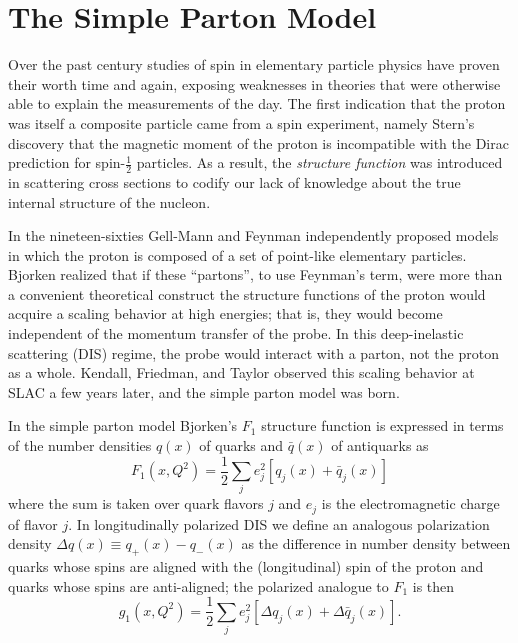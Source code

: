 \section{The Simple Parton Model}

Over the past century studies of spin in elementary particle physics have proven their worth time and again, exposing weaknesses in theories that were otherwise able to explain the measurements of the day.  The first indication that the proton was itself a composite particle came from a spin experiment, namely Stern's discovery that the magnetic moment of the proton is incompatible with the Dirac prediction for spin-\(\frac{1}{2}\) particles.  As a result, the \textit{structure function} was introduced in scattering cross sections to codify our lack of knowledge about the true internal structure of the nucleon.

In the nineteen-sixties Gell-Mann and Feynman independently proposed models in which the proton is composed of a set of point-like elementary particles. Bjorken realized that if these ``partons'', to use Feynman's term, were more than a convenient theoretical construct the structure functions of the proton would acquire a scaling behavior at high energies; that is, they would become independent of the momentum transfer of the probe.  In this deep-inelastic scattering (DIS) regime, the probe would interact with a parton, not the proton as a whole.  Kendall, Friedman, and Taylor observed this scaling behavior at SLAC a few years later, and the simple parton model was born.

In the simple parton model Bjorken's $F_1$ structure function is expressed in
terms of the number densities $q(x)$ of quarks and $\bar q(x)$ of antiquarks
as
%
\begin{equation}
  F_1(x, Q^2) = \frac{1}{2}\sum_{j}{e_j^2[q_j(x) + \bar{q}_j(x)]}
\end{equation}
%
where the sum is taken over quark flavors $j$ and $e_j$ is the electromagnetic
charge of flavor $j$. In longitudinally polarized DIS we define an analogous
polarization density $\Delta q(x) \equiv q_+(x) - q_-(x)$ as the difference in
number density between quarks whose spins are aligned with the (longitudinal)
spin of the proton and quarks whose spins are anti-aligned; the polarized
analogue to $F_1$ is then
%
\begin{equation}
  g_1(x, Q^2) = \frac{1}{2}\sum_{j}{e_j^2[\Delta q_j(x) + \Delta \bar{q}_j(x)]}.
  \label{eqn:simple-g1}
\end{equation}

